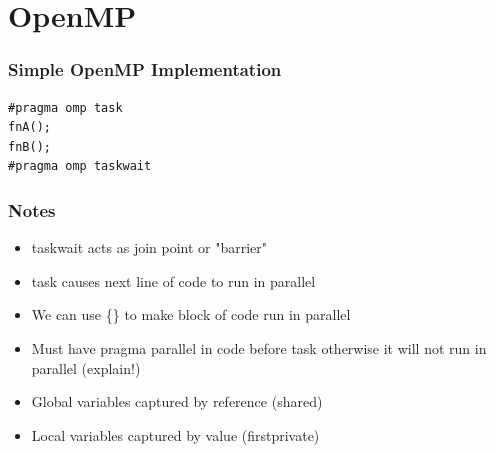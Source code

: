 \documentclass{beamer}
\begin{document}
\section{OpenMP}
  \begin{frame}[fragile=singleslide]
  	\frametitle{Simple OpenMP Implementation}
  	\begin{lstlisting}
#pragma omp task
fnA();
fnB();
#pragma omp taskwait
  	\end{lstlisting}
  \end{frame}
  
  \begin{frame}
  	\frametitle{Notes}
  	
  	\begin{itemize}
  		\item taskwait acts as join point or "barrier"
  		\item task causes next line of code to run in parallel
  		\item We can use \{\} to make block of code run in parallel
  		\item Must have pragma parallel in code before task otherwise it will not run in parallel (explain!)
  		\item Global variables captured by reference (shared)
  		\item Local variables captured by value (firstprivate)
  	\end{itemize}
  \end{frame}
\end{document}
